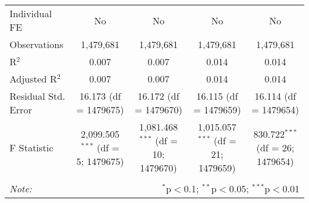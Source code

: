 \documentclass[
]{article}
\begin{document}
\begin{table}[!htbp]
{\begin{tabular}{@{\extracolsep{5pt}}lcccc}
Individual FE & No & No & No & No \\ 
Observations & 1,479,681 & 1,479,681 & 1,479,681 & 1,479,681 \\ 
R$^{2}$ & 0.007 & 0.007 & 0.014 & 0.014 \\ 
Adjusted R$^{2}$ & 0.007 & 0.007 & 0.014 & 0.014 \\ 
Residual Std. Error & 16.173 (df = 1479675) & 16.172 (df = 1479670) & 16.115 (df = 1479659) & 16.114 (df = 1479654) \\ 
F Statistic & 2,099.505$^{***}$ (df = 5; 1479675) & 1,081.468$^{***}$ (df = 10; 1479670) & 1,015.057$^{***}$ (df = 21; 1479659) & 830.722$^{***}$ (df = 26; 1479654) \\ 
\hline 
\hline \\[-1.8ex] 
\textit{Note:}  & \multicolumn{4}{r}{$^{*}$p$<$0.1; $^{**}$p$<$0.05; $^{***}$p$<$0.01} \\ 
\end{tabular}
} 
\end{table} 
\newpage
\end{document}
